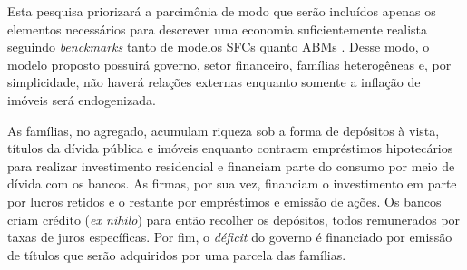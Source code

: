 Esta pesquisa priorizará a parcimônia de modo que serão incluídos apenas os elementos necessários para descrever uma economia suficientemente realista seguindo \textit{benckmarks} tanto de modelos SFCs quanto  ABMs \cites{dos_santos_simplified_2007}{caiani_agent_2016}.
Desse modo, o modelo proposto possuirá governo,  setor financeiro, famílias heterogêneas e, por simplicidade, não haverá relações externas enquanto somente a inflação de imóveis será endogenizada. 

As famílias, no agregado, acumulam riqueza sob a forma de depósitos à vista, títulos da dívida pública e imóveis enquanto contraem empréstimos hipotecários para realizar investimento residencial e financiam parte do consumo por meio de dívida com os bancos.  
As firmas, por sua vez, financiam o investimento em parte por lucros retidos e o restante por empréstimos e emissão de ações. 
Os bancos criam crédito (\textit{ex nihilo}) para então recolher os depósitos, todos remunerados por taxas de juros específicas.
Por fim, o \textit{déficit} do governo é financiado por emissão de títulos  que serão adquiridos por uma parcela das famílias. 


